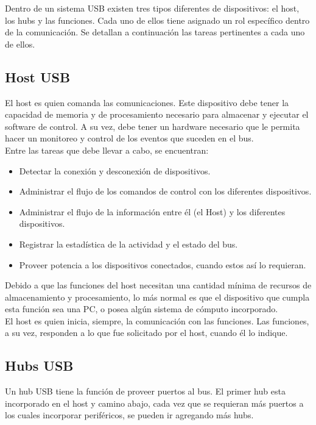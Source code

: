 Dentro de un sistema USB existen tres tipos diferentes de dispositivos: el host, los hubs y las funciones. Cada uno de ellos tiene asignado un rol específico dentro de la comunicación. Se detallan a continuación las tareas pertinentes a cada uno de ellos.\\

\subsection{Host USB}
	El host es quien comanda las comunicaciones. Este dispositivo debe tener la capacidad de memoria y de procesamiento necesario para almacenar y ejecutar el software de control. A su vez, debe tener un hardware necesario que le permita hacer un monitoreo y control de los eventos que suceden en el bus.\\
	
	Entre las tareas que debe llevar a cabo, se encuentran:
	
	\begin{itemize}
		\item Detectar la conexión y desconexión de dispositivos.
		\item Administrar el flujo de los comandos de control con los diferentes dispositivos.
		\item Administrar el flujo de la información entre él (el Host) y los diferentes dispositivos.
		\item Registrar la estadística de la actividad y el estado del bus.
		\item Proveer potencia a los dispositivos conectados, cuando estos así lo requieran.
	\end{itemize}
	
	Debido a que las funciones del host necesitan una cantidad mínima de recursos de almacenamiento y procesamiento, lo más normal es que el dispositivo que cumpla esta función sea una PC, o posea algún sistema de cómputo incorporado.\\
	
	El host es quien inicia, siempre, la comunicación con las funciones. Las funciones, a su vez, responden a lo que fue solicitado por el host, cuando él lo indique.\\
	
\subsection{Hubs USB}
	Un hub USB tiene la función de proveer puertos al bus. El primer hub esta incorporado en el host y camino abajo, cada vez que se requieran más puertos a los cuales incorporar periféricos, se pueden ir agregando más hubs.\\
	

